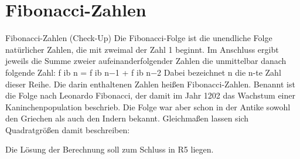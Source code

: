 \documentclass{lehramt-informatik-aufgabe}
\begin{document}
\section{Fibonacci-Zahlen}

Fibonacci-Zahlen (Check-Up)
Die Fibonacci-Folge ist die unendliche Folge natürlicher Zahlen, die mit zweimal der
Zahl 1 beginnt. Im Anschluss ergibt jeweils die Summe zweier aufeinanderfolgender
Zahlen die unmittelbar danach folgende Zahl:
f ib n = f ib n−1 + f ib n−2
Dabei bezeichnet n die n-te Zahl dieser Reihe. Die darin enthaltenen Zahlen heißen
Fibonacci-Zahlen. Benannt ist die Folge nach Leonardo Fibonacci, der damit im Jahr
1202 das Wachstum einer Kaninchenpopulation beschrieb. Die Folge war aber schon
in der Antike sowohl den Griechen als auch den Indern bekannt. Gleichmaßen lassen
sich Quadratgrößen damit beschreiben:

Die Lösung der Berechnung soll zum Schluss in R5 liegen.
\end{document}
